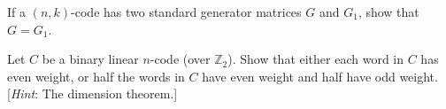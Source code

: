 \begin{multicols}{2}
\begin{ex}
If a $(n, k)$-code has two standard generator matrices $G$ and $G_{1}$, show that $G = G_{1}$.
\end{ex}

\begin{ex}
Let $C$ be a binary linear $n$-code (over $\mathbb{Z}_2$). Show that either each word in $C$ has even weight, or half the words in $C$ have even weight and half have odd weight. [\textit{Hint}: The dimension theorem.]
\end{ex}
\end{multicols}
